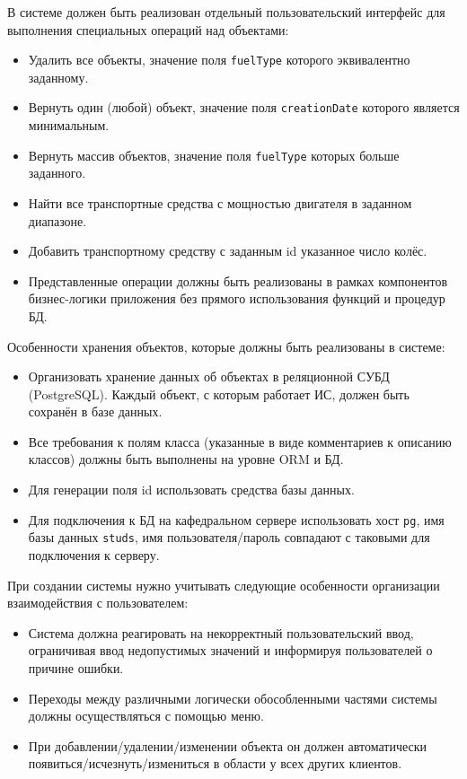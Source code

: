 \documentclass[a4paper,12pt]{article}
\begin{document}
В системе должен быть реализован отдельный пользовательский интерфейс для выполнения специальных операций над объектами:

\begin{itemize}[leftmargin=1.2cm]
    \item Удалить все объекты, значение поля \texttt{fuelType} которого эквивалентно заданному.
    \item Вернуть один (любой) объект, значение поля \texttt{creationDate} которого является минимальным.
    \item Вернуть массив объектов, значение поля \texttt{fuelType} которых больше заданного.
    \item Найти все транспортные средства с мощностью двигателя в заданном диапазоне.
    \item Добавить транспортному средству с заданным id указанное число колёс.
    \item Представленные операции должны быть реализованы в рамках компонентов бизнес-логики приложения без прямого использования функций и процедур БД.
\end{itemize}

Особенности хранения объектов, которые должны быть реализованы в системе:

\begin{itemize}[leftmargin=1.2cm]
    \item Организовать хранение данных об объектах в реляционной СУБД (PostgreSQL). Каждый объект, с которым работает ИС, должен быть сохранён в базе данных.
    \item Все требования к полям класса (указанные в виде комментариев к описанию классов) должны быть выполнены на уровне ORM и БД.
    \item Для генерации поля id использовать средства базы данных.
    \item Для подключения к БД на кафедральном сервере использовать хост \texttt{pg}, имя базы данных \texttt{studs}, имя пользователя/пароль совпадают с таковыми для подключения к серверу.
\end{itemize}

При создании системы нужно учитывать следующие особенности организации взаимодействия с пользователем:

\begin{itemize}[leftmargin=1.2cm]
    \item Система должна реагировать на некорректный пользовательский ввод, ограничивая ввод недопустимых значений и информируя пользователей о причине ошибки.
    \item Переходы между различными логически обособленными частями системы должны осуществляться с помощью меню.
    \item При добавлении/удалении/изменении объекта он должен автоматически появиться/исчезнуть/измениться в области у всех других клиентов.
\end{itemize}
\end{document}
